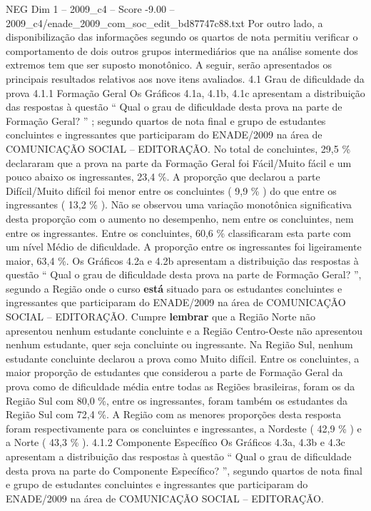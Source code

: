 \begin{textsample}{NEG Dim 1 – 2009\_c4 – Score -9.00 – 2009\_c4/enade\_2009\_com\_soc\_edit\_bd87747c88.txt}
Por outro lado, a disponibilização das informações segundo os quartos de nota permitiu verificar o comportamento de dois outros grupos intermediários que na análise somente dos extremos tem que ser suposto monotônico.
A seguir, serão apresentados os principais resultados relativos aos nove itens avaliados. 4.1 Grau de dificuldade da prova 4.1.1 Formação Geral Os Gráficos 4.1a, 4.1b, 4.1c apresentam a distribuição das respostas à questão “ Qual o grau de dificuldade desta prova na parte de Formação Geral? ” ; segundo quartos de nota final e grupo de estudantes concluintes e ingressantes que participaram do ENADE/2009 na área de COMUNICAÇÃO SOCIAL – EDITORAÇÃO.
No total de concluintes, 29,5 \% declararam que a prova na parte da Formação Geral foi Fácil/Muito fácil e um pouco abaixo os ingressantes, 23,4 \%.
A proporção que declarou a parte Difícil/Muito difícil foi menor entre os concluintes ( 9,9 \% ) do que entre os ingressantes ( 13,2 \% ).
Não se observou uma variação monotônica significativa desta proporção com o aumento no desempenho, nem entre os concluintes, nem entre os ingressantes.
Entre os concluintes, 60,6 \% classificaram esta parte com um nível Médio de dificuldade.
A proporção entre os ingressantes foi ligeiramente maior, 63,4 \%.
Os Gráficos 4.2a e 4.2b apresentam a distribuição das respostas à questão “ Qual o grau de dificuldade desta prova na parte de Formação Geral? ”, segundo a Região onde o curso \textbf{está} situado para os estudantes concluintes e ingressantes que participaram do ENADE/2009 na área de COMUNICAÇÃO SOCIAL – EDITORAÇÃO.
Cumpre \textbf{lembrar} que a Região Norte não apresentou nenhum estudante concluinte e a Região Centro-Oeste não apresentou nenhum estudante, quer seja concluinte ou ingressante.
Na Região Sul, nenhum estudante concluinte declarou a prova como Muito difícil.
Entre os concluintes, a maior proporção de estudantes que considerou a parte de Formação Geral da prova como de dificuldade média entre todas as Regiões brasileiras, foram os da Região Sul com 80,0 \%, entre os ingressantes, foram também os estudantes da Região Sul com 72,4 \%.
A Região com as menores proporções desta resposta foram respectivamente para os concluintes e ingressantes, a Nordeste ( 42,9 \% ) e a Norte ( 43,3 \% ). 4.1.2 Componente Específico Os Gráficos 4.3a, 4.3b e 4.3c apresentam a distribuição das respostas à questão “ Qual o grau de dificuldade desta prova na parte do Componente Específico? ”, segundo quartos de nota final e grupo de estudantes concluintes e ingressantes que participaram do ENADE/2009 na área de COMUNICAÇÃO SOCIAL – EDITORAÇÃO.

\end{textsample}

